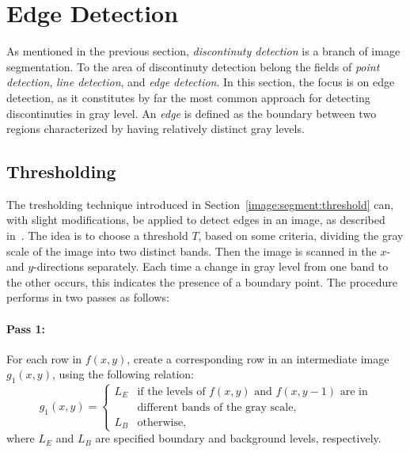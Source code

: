 
\section{Edge Detection}
\label{image:edge}

As mentioned in the previous section, {\em discontinuty detection\/}
is a branch of image segmentation.  To the area of discontinuty
detection belong the fields of {\em point detection\/}, {\em line
  detection\/}, and {\em edge detection\/}.  In this section, the
focus is on edge detection, as it constitutes by far the most common
approach for detecting discontinuties in gray level.  An {\em edge\/}
is defined as the boundary between two regions characterized by having
relatively distinct gray levels.

\subsection{Thresholding}
\label{image:edge:threshold}

The tresholding technique introduced in
Section~\ref{image:segment:threshold} can, with slight modifications,
be applied to detect edges in an image, as described in~\cite{digim}.
The idea is to choose a threshold $T$, based on some criteria,
dividing the gray scale of the image into two distinct bands.  Then
the image is scanned in the $x$- and $y$-directions separately.  Each
time a change in gray level from one band to the other occurs, this
indicates the presence of a boundary point.  The procedure performs in
two passes as follows:

\paragraph{Pass 1:} For each row in $f(x,y)$, create a corresponding
row in an intermediate image $g_{1}(x,y)$, using the following
relation: 
\begin{equation}
  g_{1}(x,y)=\left\{
    \begin{array}{ll}
      L_{E} & \mbox{if the levels of $f(x,y)$ and $f(x,y-1)$ are in} \\
            & \mbox{different bands of the gray scale,} \\
      L_{B} & \mbox{otherwise,}
    \end{array}\right.
\end{equation}
where $L_{E}$ and $L_{B}$ are specified boundary and background
levels, respectively.

